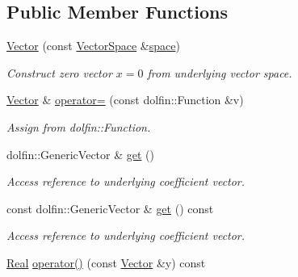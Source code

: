 \subsection*{\-Public \-Member \-Functions}
\begin{DoxyCompactItemize}
\item 
\hypertarget{classSpacy_1_1FEniCS_1_1Vector_ad73e826490b7b7be5588e9c0c9318cb5}{\hyperlink{classSpacy_1_1FEniCS_1_1Vector_ad73e826490b7b7be5588e9c0c9318cb5}{\-Vector} (const \hyperlink{classSpacy_1_1VectorSpace}{\-Vector\-Space} \&\hyperlink{classSpacy_1_1VectorBase_aa999dbf9d679d895dfe04c10fbf9f5e9}{space})}\label{classSpacy_1_1FEniCS_1_1Vector_ad73e826490b7b7be5588e9c0c9318cb5}

\begin{DoxyCompactList}\small\item\em \-Construct zero vector $x=0$ from underlying vector space. \end{DoxyCompactList}\item 
\hypertarget{classSpacy_1_1FEniCS_1_1Vector_ad4d68b813d9374aa83f37ec2b3ad02fc}{\hyperlink{classSpacy_1_1FEniCS_1_1Vector}{\-Vector} \& \hyperlink{classSpacy_1_1FEniCS_1_1Vector_ad4d68b813d9374aa83f37ec2b3ad02fc}{operator=} (const dolfin\-::\-Function \&v)}\label{classSpacy_1_1FEniCS_1_1Vector_ad4d68b813d9374aa83f37ec2b3ad02fc}

\begin{DoxyCompactList}\small\item\em \-Assign from dolfin\-::\-Function. \end{DoxyCompactList}\item 
\hypertarget{classSpacy_1_1FEniCS_1_1Vector_afadf508451c68fd767da6a1be4852fed}{dolfin\-::\-Generic\-Vector \& \hyperlink{classSpacy_1_1FEniCS_1_1Vector_afadf508451c68fd767da6a1be4852fed}{get} ()}\label{classSpacy_1_1FEniCS_1_1Vector_afadf508451c68fd767da6a1be4852fed}

\begin{DoxyCompactList}\small\item\em \-Access reference to underlying coefficient vector. \end{DoxyCompactList}\item 
\hypertarget{classSpacy_1_1FEniCS_1_1Vector_ac69fe18ef6818182186f9db82da0f7e2}{const dolfin\-::\-Generic\-Vector \& \hyperlink{classSpacy_1_1FEniCS_1_1Vector_ac69fe18ef6818182186f9db82da0f7e2}{get} () const }\label{classSpacy_1_1FEniCS_1_1Vector_ac69fe18ef6818182186f9db82da0f7e2}

\begin{DoxyCompactList}\small\item\em \-Access reference to underlying coefficient vector. \end{DoxyCompactList}\item 
\hypertarget{classSpacy_1_1FEniCS_1_1Vector_a99a75031c47961b9ef1161197c4d3f8e}{\hyperlink{classSpacy_1_1Real}{\-Real} \hyperlink{classSpacy_1_1FEniCS_1_1Vector_a99a75031c47961b9ef1161197c4d3f8e}{operator()} (const \hyperlink{classSpacy_1_1FEniCS_1_1Vector}{\-Vector} \&y) const }\label{classSpacy_1_1FEniCS_1_1Vector_a99a75031c47961b9ef1161197c4d3f8e}


\end{DoxyCompactItemize}
